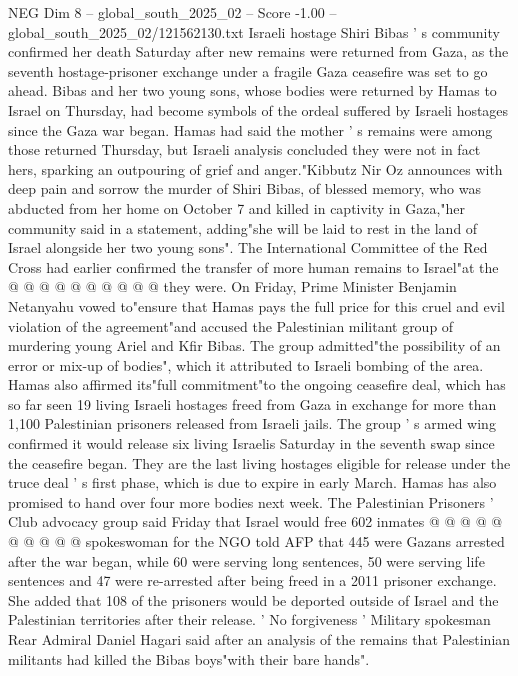 \begin{textsample}{NEG Dim 8 – global\_south\_2025\_02 – Score -1.00 – global\_south\_2025\_02/121562130.txt}  \label{ex:f8_neg_375}
Israeli hostage Shiri Bibas ' s community confirmed her death Saturday after new remains were returned from Gaza, as the seventh hostage-prisoner exchange under a fragile Gaza ceasefire was set to go ahead.
Bibas and her two young sons, whose bodies were returned by Hamas to Israel on Thursday, had become symbols of the ordeal suffered by Israeli hostages since the Gaza war began.
Hamas had said the mother ' s remains were among those returned Thursday, but Israeli analysis concluded they were not in fact hers, sparking an outpouring of grief and anger."Kibbutz Nir Oz announces with deep pain and sorrow the murder of Shiri Bibas, of blessed memory, who was abducted from her home on October 7 and killed in captivity in Gaza,"her community said in a statement, adding"she will be laid to rest in the land of Israel alongside her two young sons".
The International Committee of the Red Cross had earlier confirmed the transfer of more human remains to Israel"at the @ @ @ @ @ @ @ @ @ @ they were.
On Friday, Prime Minister Benjamin Netanyahu vowed to"ensure that Hamas pays the full price for this cruel and evil violation of the agreement"and accused the Palestinian militant group of murdering young Ariel and Kfir Bibas.
The group admitted"the possibility of an error or mix-up of bodies", which it attributed to Israeli bombing of the area.
Hamas also affirmed its"full commitment"to the ongoing ceasefire deal, which has so far seen 19 living Israeli hostages freed from Gaza in exchange for more than 1,100 Palestinian prisoners released from Israeli jails.
The group ' s armed wing confirmed it would release six living Israelis Saturday in the seventh swap since the ceasefire began.
They are the last living hostages eligible for release under the truce deal ' s first phase, which is due to expire in early March.
Hamas has also promised to hand over four more bodies next week.
The Palestinian Prisoners ' Club advocacy group said Friday that Israel would free 602 inmates @ @ @ @ @ @ @ @ @ @ spokeswoman for the NGO told AFP that 445 were Gazans arrested after the war began, while 60 were serving long sentences, 50 were serving life sentences and 47 were re-arrested after being freed in a 2011 prisoner exchange.
She added that 108 of the prisoners would be deported outside of Israel and the Palestinian territories after their release. ' No forgiveness ' Military spokesman Rear Admiral Daniel Hagari said after an analysis of the remains that Palestinian militants had killed the Bibas boys"with their bare hands".

\end{textsample}

